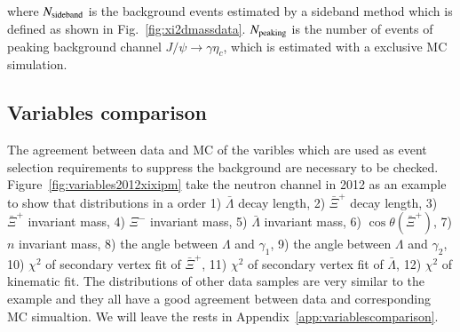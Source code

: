 where $N_{\rm sideband}$ is the background events estimated by a sideband method 
which is defined as shown in Fig.~\ref{fig:xi2dmassdata}. $N_{\rm peaking}$
is the number of events of peaking background channel $J/\psi \to \gamma \eta_c$,
which is estimated with a exclusive MC simulation.







\subsection{Variables comparison}
The agreement between data and MC of the varibles which are used as 
event selection requirements to suppress the background are necessary
to be checked. Figure~\ref{fig:variables2012xixipm} take the neutron 
channel in 2012 as an example to show that distributions in a order
1) $\bar{\Lambda}$ decay length, 2) $\bar{\Xi}^+$ decay length, 
3) $\bar{\Xi}^+$ invariant mass, 4) $\Xi^-$ invariant mass,
5) $\bar{\Lambda}$ invariant mass, 6) $\cos \theta (\bar{\Xi}^+)$,
7) $n$ invariant mass, 8) the angle between $\Lambda$ and $\gamma_1$,
9) the angle between $\Lambda$ and $\gamma_2$, 
10) $\chi^2$ of secondary vertex fit of $\bar{\Xi}^+$,
11) $\chi^2$ of secondary vertex fit of $\bar{\Lambda}$,
12) $\chi^2$ of kinematic fit.
The distributions of other data samples are very similar to 
the example and they all have a good agreement between data 
and corresponding MC simualtion. We will leave the rests in 
Appendix~\ref{app:variablescomparison}.




